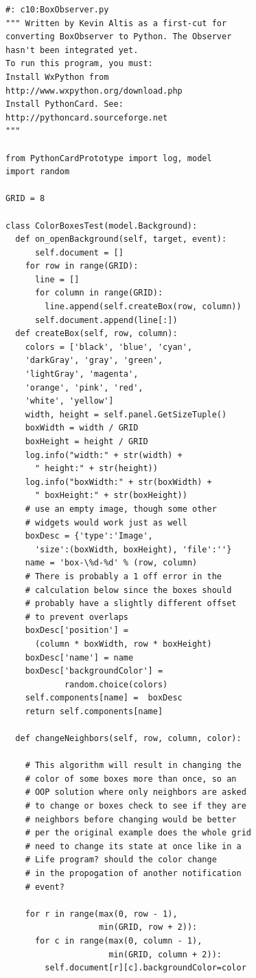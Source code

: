 \documentclass{article}
\begin{document}
\begin{lstlisting} 
#: c10:BoxObserver.py 
""" Written by Kevin Altis as a first-cut for 
converting BoxObserver to Python. The Observer 
hasn't been integrated yet. 
To run this program, you must: 
Install WxPython from 
http://www.wxpython.org/download.php 
Install PythonCard. See: 
http://pythoncard.sourceforge.net 
""" 

from PythonCardPrototype import log, model 
import random 

GRID = 8 

class ColorBoxesTest(model.Background): 
  def on_openBackground(self, target, event):
      self.document = [] 
    for row in range(GRID): 
      line = [] 
      for column in range(GRID): 
        line.append(self.createBox(row, column)) 
      self.document.append(line[:]) 
  def createBox(self, row, column): 
    colors = ['black', 'blue', 'cyan', 
    'darkGray', 'gray', 'green', 
    'lightGray', 'magenta', 
    'orange', 'pink', 'red', 
    'white', 'yellow'] 
    width, height = self.panel.GetSizeTuple() 
    boxWidth = width / GRID 
    boxHeight = height / GRID 
    log.info("width:" + str(width) + 
      " height:" + str(height)) 
    log.info("boxWidth:" + str(boxWidth) + 
      " boxHeight:" + str(boxHeight)) 
    # use an empty image, though some other 
    # widgets would work just as well 
    boxDesc = {'type':'Image', 
      'size':(boxWidth, boxHeight), 'file':''} 
    name = 'box-\%d-%d' % (row, column) 
    # There is probably a 1 off error in the 
    # calculation below since the boxes should 
    # probably have a slightly different offset 
    # to prevent overlaps 
    boxDesc['position'] = 
      (column * boxWidth, row * boxHeight) 
    boxDesc['name'] = name 
    boxDesc['backgroundColor'] = 
            random.choice(colors) 
    self.components[name] =  boxDesc 
    return self.components[name] 
    
  def changeNeighbors(self, row, column, color): 
  
    # This algorithm will result in changing the 
    # color of some boxes more than once, so an 
    # OOP solution where only neighbors are asked 
    # to change or boxes check to see if they are 
    # neighbors before changing would be better 
    # per the original example does the whole grid 
    # need to change its state at once like in a 
    # Life program? should the color change  
    # in the propogation of another notification 
    # event? 
    
    for r in range(max(0, row - 1),  
                   min(GRID, row + 2)): 
      for c in range(max(0, column - 1),  
                     min(GRID, column + 2)): 
        self.document[r][c].backgroundColor=color 
        

\end{lstlisting}
\end{document}
